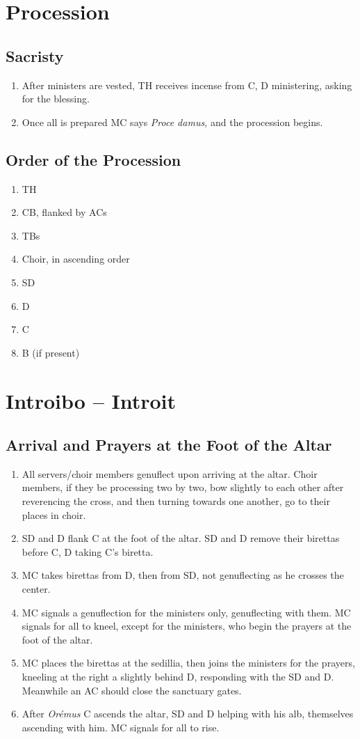 \documentclass[letterpaper, twocolumn]{article}
\begin{document}
	\section*{Procession}
	\subsection*{Sacristy}
	\begin{enumerate}
		\item After ministers are vested, TH receives incense from C, D ministering, asking for the blessing.
		\item Once all is prepared MC says \textit{Proce damus,} and the procession begins.
	\end{enumerate}
	\subsection*{Order of the Procession}
	\begin{enumerate}
		\item TH
		\item CB, flanked by ACs
		\item TBs
		\item Choir, in ascending order
		\item SD
		\item D
		\item C
		\item B (if present)
	\end{enumerate}
	\section*{Introibo -- Introit}
		\subsection*{Arrival and Prayers at the Foot of the Altar}
		\begin{enumerate}
			\item All servers/choir members genuflect upon arriving at the altar. Choir members, if they be processing two by two, bow slightly to each other after reverencing the cross, and then turning towards one another, go to their places in choir.
			\item SD and D flank C at the foot of the altar. SD and D remove their birettas before C, D taking C's biretta.
			\item MC takes birettas from D, then from SD, not genuflecting as he crosses the center.
			\item MC signals a genuflection for the ministers only, genuflecting with them. MC signals for all to kneel, except for the ministers, who begin the prayers at the foot of the altar.
			\item MC places the birettas at the sedillia, then joins the ministers for the prayers, kneeling at the right a slightly behind D, responding with the SD and D. Meanwhile an AC should close the sanctuary gates.
			\item After \textit{Orémus} C ascends the altar, SD and D helping with his alb, themselves ascending with him. MC signals for all to rise.
		\end{enumerate}
\end{document}
